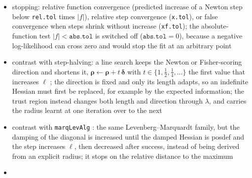 \begin{remark}
\begin{itemize}
          that is, a ball of Aitchison distance on the simplex, the same for every Helmert basis; the first radius is \(1\)
          (control \texttt{step.min}, PORT \texttt{LMAX0})
    \item stopping: relative function convergence (predicted increase of a Newton step below \texttt{rel.tol} times
          \(\lvert f\rvert\)), relative step convergence (\texttt{x.tol}), or false convergence when steps shrink without increase
          (\texttt{xf.tol}); the absolute-function test \(\lvert f\rvert<\texttt{abs.tol}\) is switched off (\(\texttt{abs.tol}=0\)), because a
          negative log-likelihood can cross zero and would stop the fit at an arbitrary point
    \item contrast with step-halving: a line search keeps the Newton or Fisher-scoring direction and shortens it,
          \(\boldsymbol{\rho}\gets\boldsymbol{\rho}+t\,\boldsymbol{\delta}\) with \(t\in\{1,\tfrac12,\tfrac14,\ldots\}\) the first value that increases \(\ell\) \cite{jennrichNewtonRaphsonRelatedAlgorithms1976}; the
          direction is fixed and only its length adapts, so an indefinite Hessian must first be replaced, for example by the
          expected information; the trust region instead changes both length and direction through \(\lambda\), and carries the
          radius learnt at one iteration over to the next
    \item contrast with \texttt{marqLevAlg} \cite{R-marqLevAlg,philippsRobustEfficientOptimization2021}: the same Levenberg--Marquardt family,
          but the damping of the diagonal is increased until the damped Hessian is \gls{posdef} and the step increases \(\ell\),
          then decreased after success, instead of being derived from an explicit radius; it stops on the relative distance to
          the maximum \cite{commengesNewtonLikeAlgorithmLikelihood2006}
    \item[] 
  \end{itemize}
\end{remark}

